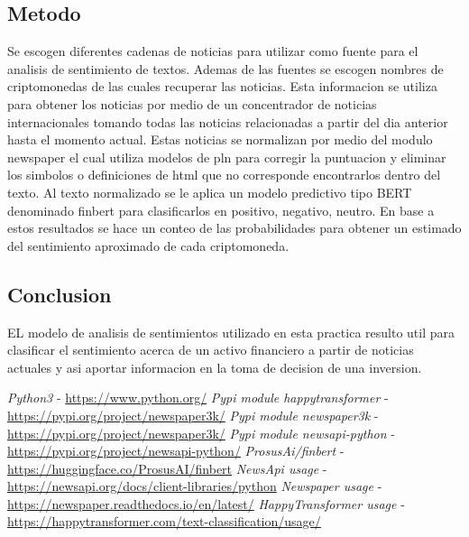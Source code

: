 \documentclass[12pt,jou]{apa7}
\begin{document}
\subsection{Metodo}\label{subsec:metodo}
Se escogen diferentes cadenas de noticias para utilizar como fuente
para el analisis de sentimiento de textos.
Ademas de las fuentes se escogen nombres de criptomonedas de las cuales
recuperar las noticias.
Esta informacion se utiliza para obtener los noticias por medio
de un concentrador de noticias internacionales\cite{cite_06} tomando todas las noticias
relacionadas a partir del dia anterior hasta el momento actual.
Estas noticias se normalizan por medio del modulo newspaper\cite{cite_07} el cual utiliza
modelos de pln para corregir la puntuacion y eliminar los simbolos o definiciones de html
que no corresponde encontrarlos dentro del texto.
Al texto normalizado se le aplica un modelo predictivo tipo BERT\cite{cite_08}
denominado finbert para clasificarlos en positivo, negativo, neutro.
En base a estos resultados se hace un conteo de las probabilidades para
obtener un estimado del sentimiento aproximado de cada criptomoneda.
\subsection{Conclusion}\label{subsec:conclusion}
EL modelo de analisis de sentimientos utilizado en esta practica
resulto util para clasificar el sentimiento acerca de un activo
financiero a partir de noticias actuales y asi aportar informacion
en la toma de decision de una inversion.
\pagebreak
\begin{thebibliography}{99}
 \emph{Python3} - \url{https://www.python.org/}
 \emph{Pypi module happytransformer} - \url{https://pypi.org/project/newspaper3k/}
 \emph{Pypi module newspaper3k} - \url{https://pypi.org/project/newspaper3k/}
 \emph{Pypi module newsapi-python} - \url{https://pypi.org/project/newsapi-python/}
 \emph{ProsusAi/finbert} - \url{https://huggingface.co/ProsusAI/finbert}
 \emph{NewsApi usage} - \url{https://newsapi.org/docs/client-libraries/python}
 \emph{Newspaper usage} - \url{https://newspaper.readthedocs.io/en/latest/}
 \emph{HappyTransformer usage} - \url{https://happytransformer.com/text-classification/usage/}
\end{thebibliography}
\end{document}
